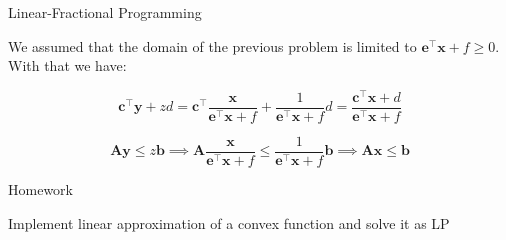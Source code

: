 \documentclass{beamer}
\begin{document}
\begin{frame}{Linear-Fractional Programming}
	\begin{flushleft}
		
		We assumed that the domain of the previous problem is limited to $\mathbf{e}^\top \mathbf{x} + f \geq 0$. With that we have:
		
		\begin{equation}
			 \mathbf{c}^\top \mathbf{y} + z d 
			 = 
			 \mathbf{c}^\top\frac{\mathbf{x}}{\mathbf{e}^\top \mathbf{x} + f} + \frac{1}{\mathbf{e}^\top \mathbf{x} + f} d 
			 =
			 \frac{\mathbf{c}^\top\mathbf{x} + d}{\mathbf{e}^\top \mathbf{x} + f}
		\end{equation}
		
		
		\begin{equation}
			\mathbf{A} \mathbf{y} \leq z \mathbf{b} 
			\implies
			\mathbf{A} \frac{\mathbf{x}}{\mathbf{e}^\top \mathbf{x} + f} \leq \frac{1}{\mathbf{e}^\top \mathbf{x} + f} \mathbf{b} 
			\implies
			\mathbf{A} \mathbf{x} \leq \mathbf{b} 
		\end{equation}
		
		
	\end{flushleft}
\end{frame}





\begin{frame}{Homework}
\begin{flushleft}

Implement linear approximation of a convex function and solve it as LP

\end{flushleft}
\end{frame}




\myqrframe
\end{document}
